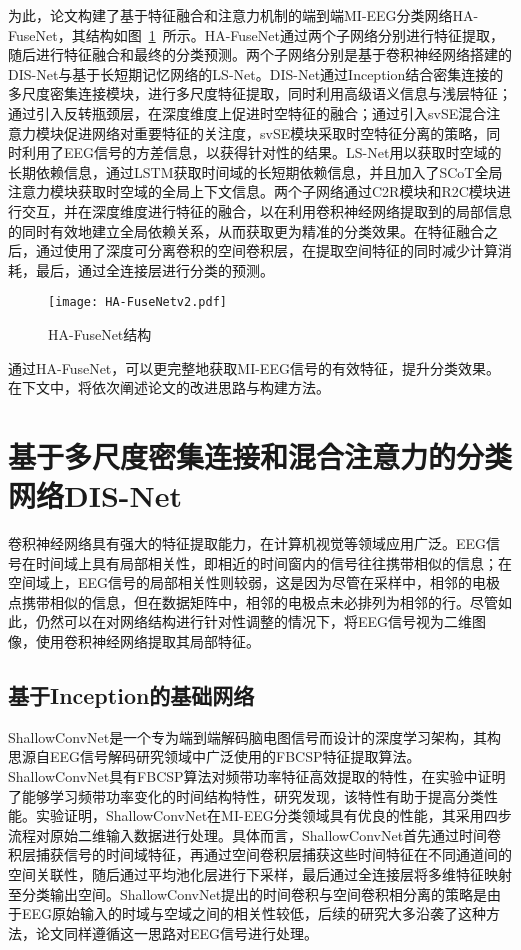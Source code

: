为此，论文构建了基于特征融合和注意力机制的端到端MI-EEG分类网络HA-FuseNet，其结构如图~\ref{fig:hafuse}~所示。HA-FuseNet通过两个子网络分别进行特征提取，随后进行特征融合和最终的分类预测。两个子网络分别是基于卷积神经网络搭建的DIS-Net与基于长短期记忆网络的LS-Net。DIS-Net通过Inception结合密集连接的多尺度密集连接模块，进行多尺度特征提取，同时利用高级语义信息与浅层特征；通过引入反转瓶颈层，在深度维度上促进时空特征的融合；通过引入svSE混合注意力模块促进网络对重要特征的关注度，svSE模块采取时空特征分离的策略，同时利用了EEG信号的方差信息，以获得针对性的结果。LS-Net用以获取时空域的长期依赖信息，通过LSTM获取时间域的长短期依赖信息，并且加入了SCoT全局注意力模块获取时空域的全局上下文信息。两个子网络通过C2R模块和R2C模块进行交互，并在深度维度进行特征的融合，以在利用卷积神经网络提取到的局部信息的同时有效地建立全局依赖关系，从而获取更为精准的分类效果。在特征融合之后，通过使用了深度可分离卷积的空间卷积层，在提取空间特征的同时减少计算消耗，最后，通过全连接层进行分类的预测。
\begin{figure}
    \centering
    \texttt{[image: HA-FuseNetv2.pdf]}
    \caption{HA-FuseNet结构}
    \label{fig:hafuse}
  \end{figure}

通过HA-FuseNet，可以更完整地获取MI-EEG信号的有效特征，提升分类效果。在下文中，将依次阐述论文的改进思路与构建方法。

\section{基于多尺度密集连接和混合注意力的分类网络DIS-Net}

卷积神经网络具有强大的特征提取能力，在计算机视觉等领域应用广泛。EEG信号在时间域上具有局部相关性，即相近的时间窗内的信号往往携带相似的信息；在空间域上，EEG信号的局部相关性则较弱，这是因为尽管在采样中，相邻的电极点携带相似的信息，但在数据矩阵中，相邻的电极点未必排列为相邻的行。尽管如此，仍然可以在对网络结构进行针对性调整的情况下，将EEG信号视为二维图像，使用卷积神经网络提取其局部特征。

\subsection{基于Inception的基础网络}

ShallowConvNet\cite{schirrmeister2017deep}是一个专为端到端解码脑电图信号而设计的深度学习架构，其构思源自EEG信号解码研究领域中广泛使用的FBCSP特征提取算法。ShallowConvNet具有FBCSP算法对频带功率特征高效提取的特性，在实验中证明了能够学习频带功率变化的时间结构特性\cite{schirrmeister2017deep}，研究发现，该特性有助于提高分类性能\cite{sakhavi2015parallel}。实验证明，ShallowConvNet在MI-EEG分类领域具有优良的性能\cite{lawhern2018eegnet}，其采用四步流程对原始二维输入数据进行处理。具体而言，ShallowConvNet首先通过时间卷积层捕获信号的时间域特征，再通过空间卷积层捕获这些时间特征在不同通道间的空间关联性，随后通过平均池化层进行下采样，最后通过全连接层将多维特征映射至分类输出空间。ShallowConvNet提出的时间卷积与空间卷积相分离的策略是由于EEG原始输入的时域与空域之间的相关性较低，后续的研究大多沿袭了这种方法，论文同样遵循这一思路对EEG信号进行处理。

